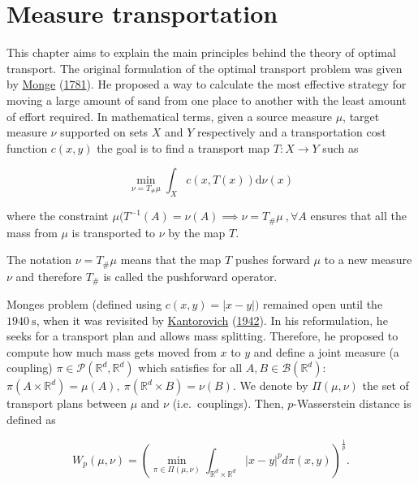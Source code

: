 \documentclass[
  11pt,
]{article}
\begin{document}
\hypertarget{measure-transportation}{%
\section{Measure transportation}\label{measure-transportation}}

This chapter aims to explain the main principles behind the theory of
optimal transport. The original formulation of the optimal transport
problem was given by \protect\hyperlink{ref-monge1781memoire}{Monge}
(\protect\hyperlink{ref-monge1781memoire}{1781}). He proposed a way to
calculate the most effective strategy for moving a large amount of sand
from one place to another with the least amount of effort required. In
mathematical terms, given a source measure \(\mu\), target measure
\(\nu\) supported on sets \(X\) and \(Y\) respectively and a
transportation cost function \(c(x,y)\) the goal is to find a transport
map \(T:X \rightarrow Y\) such as

\[\min _{\nu=T_{\#} \mu} \int_{X} c(x, T(x)) \mathrm{d} \nu(x)\]

where the constraint
\(\mu(T^{-1}(A) = \nu(A) \implies \nu=T_{\#} \mu \ , \forall A\) ensures
that all the mass from \(\mu\) is transported to \(\nu\) by the map
\(T\).

The notation \(\nu=T_{\#} \mu\) means that the map \(T\) pushes forward
\(\mu\) to a new measure \(\nu\) and therefore \(T_{\#}\) is called the
pushforward operator.

Monges problem (defined using \(c(x, y)=|x-y|)\) remained open until the
\(1940 \mathrm{~s}\), when it was revisited by
\protect\hyperlink{ref-kantorovich1942translocation}{Kantorovich}
(\protect\hyperlink{ref-kantorovich1942translocation}{1942}). In his
reformulation, he seeks for a transport plan and allows mass splitting.
Therefore, he proposed to compute how much mass gets moved from \(x\) to
\(y\) and define a joint measure (a coupling)
\(\pi \in \mathcal{P}\left(\mathbb{R}^{d}, \mathbb{R}^{d}\right)\) which
satisfies for all \(A, B \in \mathcal{B}\left(\mathbb{R}^{d}\right)\):
\(\pi\left(A \times \mathbb{R}^{d}\right)=\mu(A), \ \pi\left(\mathbb{R}^{d} \times B\right)=\nu(B).\)
We denote by \(\Pi(\mu, \nu)\) the set of transport plans between
\(\mu\) and \(\nu\) (i.e.~couplings). Then, \(p\)-Wasserstein distance
is defined as

\begin{equation}
W_{p}(\mu, \nu)=\left(\min _{\pi \in \Pi(\mu, \nu)} \int_{\mathbb{R}^{d} \times \mathbb{R}^{d}}|x-y|^{p} d \pi(x, y)\right)^{\frac{1}{p}}.
\label{eq:wass_p}
\end{equation}
\end{document}
